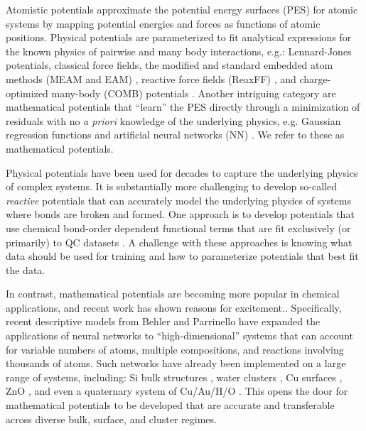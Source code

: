 \documentclass[12pt]{cmuthesis}
\begin{document}
Atomistic potentials approximate the potential energy surfaces (PES) for atomic systems by mapping potential energies and forces as functions of atomic positions. Physical potentials are parameterized to fit analytical expressions for the known physics of pairwise and many body interactions, e.g.: Lennard-Jones potentials, \cite{jones-1924-deter-molec-field} classical force fields, \cite{brooks-1983-charm,rappe-1992-uff,casewit-1992-applic,cornell-1995-secon-gener,cornell-1996-secon-gener} the modified and standard embedded atom methods (MEAM and EAM) \cite{daw-1983-semiem-quant,baskes-1992-modif}, reactive force fields (ReaxFF) \cite{duin-2001-reaxf}, and charge-optimized many-body (COMB) potentials \cite{liang-2012-variab-charg}. Another intriguing category are mathematical potentials that ``learn'' the PES directly through a minimization of residuals with no \emph{a priori} knowledge of the underlying physics, e.g. Gaussian regression functions \cite{rasmussen-2004-gauss-proces} and artificial neural networks (NN) \cite{haykin-2009-neural-networ}. We refer to these as mathematical potentials.

Physical potentials have been used for decades to capture the underlying physics of complex systems. It is substantially more challenging to develop so-called \emph{reactive} potentials that can accurately model the underlying physics of systems where bonds are broken and formed. One approach is to develop potentials that use chemical bond-order dependent functional terms that are fit exclusively (or primarily) to QC datasets \cite{liang-2013-react-poten}. A challenge with these approaches is knowing what data should be used for training and how to parameterize potentials that best fit the data.

In contrast, mathematical potentials are becoming more popular in chemical applications, and recent work has shown reasons for excitement.\cite{behler-2011-neural,behler-2014-repres}. Specifically, recent descriptive models from Behler and Parrinello \cite{behler-2007-gener-neural} have expanded the applications of neural networks to ``high-dimensional'' systems that can account for variable numbers of atoms, multiple compositions, and reactions involving thousands of atoms. Such networks have already been implemented on a large range of systems, including: Si bulk structures \cite{behler-2008-press}, water clusters \cite{morawietz-2013-densit-funct}, Cu surfaces \cite{artrith-2012-high}, ZnO \cite{artrith-2011-high}, and even a quaternary system of Cu/Au/H/O \cite{artrith-2015-grand-cu}. This opens the door for mathematical potentials to be developed that are accurate and transferable across diverse bulk, surface, and cluster regimes.
\end{document}
